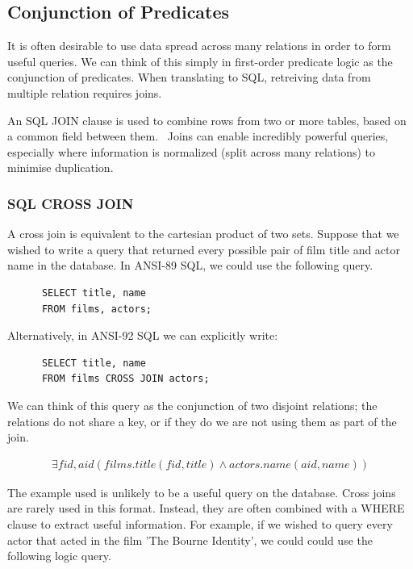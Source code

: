 \documentclass[a4paper, 11pt]{article}
\begin{document}
  \subsection{Conjunction of Predicates}
    \label{sec:joins}

    It is often desirable to use data spread across many relations in order to
    form useful queries. We can think of this simply in first-order predicate
    logic as the conjunction of predicates. When translating to SQL, retreiving
    data from multiple relation requires joins.

    An SQL JOIN clause is used to combine rows from two or more tables, based
    on a common field between them.~\cite{w3JOINS} Joins can enable incredibly
    powerful queries, especially where information
    is normalized (split across many relations) to minimise duplication.

    \subsubsection{SQL CROSS JOIN}

      A cross join is equivalent to the cartesian product of two sets. Suppose
      that we wished to write a query that returned every possible pair of
      film title and actor name in the database. In ANSI-89 SQL, we could use 
      the following query.

      \begin{verbatim}
      SELECT title, name
      FROM films, actors;
      \end{verbatim}

      Alternatively, in ANSI-92 SQL we can explicitly write:

      \begin{verbatim}
      SELECT title, name
      FROM films CROSS JOIN actors;
      \end{verbatim}

      We can think of this query as the conjunction of two disjoint relations;
      the relations do not share a key, or if they do we are not using them as
      part of the join.

      \begin{gather}
        \exists fid, aid(films.title(fid, title) \land actors.name(aid, name))
      \end{gather}

      The example used is unlikely to be a useful query on the database. Cross
      joins are rarely used in this format. Instead, they are often combined
      with a WHERE clause to extract useful information. For example, if we
      wished to query every actor that acted in the film 'The Bourne Identity',
      we could could use the following logic query.
\end{document}
